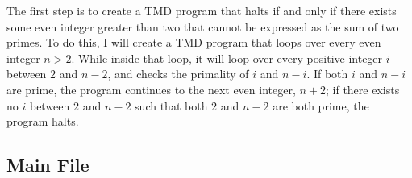 \documentclass[11pt]{report}
\begin{document}
The first step is to create a TMD program that halts if and only if there exists some even integer greater than two that cannot be expressed as the sum of two primes. To do this, I will create a TMD program that loops over every even integer $n > 2$. While inside that loop, it will loop over every positive integer $i$ between $2$ and $n-2$, and checks the primality of $i$ and $n-i$. If both $i$ and $n-i$ are prime, the program continues to the next even integer, $n+2$; if there exists no $i$ between $2$ and $n-2$ such that both $2$ and $n-2$ are both prime, the program halts. %

\subsection{Main File \label{sec:mainfilegoldbach}}
\end{document}
